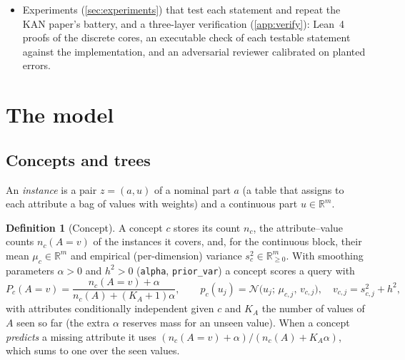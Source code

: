 \documentclass[11pt]{article}
\theoremstyle{definition}
\newtheorem{definition}[theorem]{Definition}
\theoremstyle{remark}
\newcommand{\R}{\mathbb{R}}
\newcommand{\N}{\mathcal{N}}
\begin{document}
\begin{itemize}[leftmargin=*]
  research---associative, contextual, retrieval, self-generated, instructional, and
  blocked cues---onto validities of forest quantities, proves what each kind requires
  (\cref{prop:cues}: a contextual cue passes nothing through an activation and must be
  merged or passed as a label; a redundant cue is blocked), and turns this into a
  procedure that designs a forest from held-out errors of Cobweb trees alone
  (\cref{proc:cues}).
\item Experiments (\cref{sec:experiments}) that test each statement and repeat the KAN
  paper's battery, and a three-layer verification (\cref{app:verify}): Lean~4 proofs of
  the discrete cores, an executable check of each testable statement against the
  implementation, and an adversarial reviewer calibrated on planted errors.
\end{itemize}

\section{The model}\label{sec:model}

\subsection{Concepts and trees}

An \emph{instance} is a pair $z=(a,u)$ of a nominal part $a$ (a table that assigns to
each attribute a bag of values with weights) and a continuous part $u\in\R^m$.

\begin{definition}[Concept]\label{def:concept}
A concept $c$ stores its count $n_c$, the attribute--value counts $n_c(A{=}v)$ of the
instances it covers, and, for the continuous block, their mean $\mu_c\in\R^m$ and
empirical (per-dimension) variance $s_c^2\in\R^m_{\ge0}$.  With smoothing parameters
$\alpha>0$ and $h^2>0$ (\texttt{alpha}, \texttt{prior\_var}) a concept scores a query
with
\[
  P_c(A{=}v)=\frac{n_c(A{=}v)+\alpha}{n_c(A)+(K_A+1)\alpha},\qquad
  p_c(u_j)=\N\bigl(u_j;\,\mu_{c,j},\,v_{c,j}\bigr),\quad v_{c,j}=s^2_{c,j}+h^2,
\]
with attributes conditionally independent given $c$ and $K_A$ the number of values of $A$
seen so far (the extra $\alpha$ reserves mass for an unseen value).  When a concept
\emph{predicts} a missing attribute it uses $(n_c(A{=}v)+\alpha)/(n_c(A)+K_A\alpha)$,
which sums to one over the seen values.
\end{definition}
\end{document}

